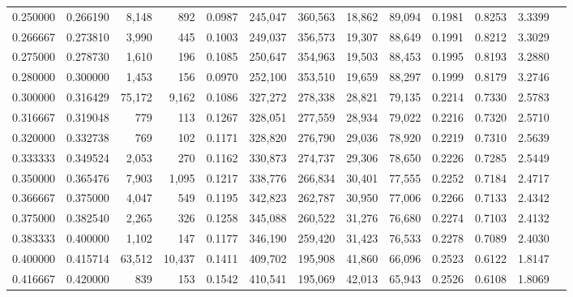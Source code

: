 \begin{tabular}{rrrrrrrrrrrrr}
0.250000 & 0.266190 &  8,148 &    892 &                                     0.0987 & 245,047 & 360,563 &  18,862 &  89,094 & 0.1981 & 0.8253 & 3.3399 \\
0.266667 & 0.273810 &  3,990 &    445 &                                     0.1003 & 249,037 & 356,573 &  19,307 &  88,649 & 0.1991 & 0.8212 & 3.3029 \\
0.275000 & 0.278730 &  1,610 &    196 &                                     0.1085 & 250,647 & 354,963 &  19,503 &  88,453 & 0.1995 & 0.8193 & 3.2880 \\
0.280000 & 0.300000 &  1,453 &    156 &                                     0.0970 & 252,100 & 353,510 &  19,659 &  88,297 & 0.1999 & 0.8179 & 3.2746 \\
0.300000 & 0.316429 & 75,172 &  9,162 &                                     0.1086 & 327,272 & 278,338 &  28,821 &  79,135 & 0.2214 & 0.7330 & 2.5783 \\
0.316667 & 0.319048 &    779 &    113 &                                     0.1267 & 328,051 & 277,559 &  28,934 &  79,022 & 0.2216 & 0.7320 & 2.5710 \\
0.320000 & 0.332738 &    769 &    102 &                                     0.1171 & 328,820 & 276,790 &  29,036 &  78,920 & 0.2219 & 0.7310 & 2.5639 \\
0.333333 & 0.349524 &  2,053 &    270 &                                     0.1162 & 330,873 & 274,737 &  29,306 &  78,650 & 0.2226 & 0.7285 & 2.5449 \\
0.350000 & 0.365476 &  7,903 &  1,095 &                                     0.1217 & 338,776 & 266,834 &  30,401 &  77,555 & 0.2252 & 0.7184 & 2.4717 \\
0.366667 & 0.375000 &  4,047 &    549 &                                     0.1195 & 342,823 & 262,787 &  30,950 &  77,006 & 0.2266 & 0.7133 & 2.4342 \\
0.375000 & 0.382540 &  2,265 &    326 &                                     0.1258 & 345,088 & 260,522 &  31,276 &  76,680 & 0.2274 & 0.7103 & 2.4132 \\
0.383333 & 0.400000 &  1,102 &    147 &                                     0.1177 & 346,190 & 259,420 &  31,423 &  76,533 & 0.2278 & 0.7089 & 2.4030 \\
0.400000 & 0.415714 & 63,512 & 10,437 &                                     0.1411 & 409,702 & 195,908 &  41,860 &  66,096 & 0.2523 & 0.6122 & 1.8147 \\
0.416667 & 0.420000 &    839 &    153 &                                     0.1542 & 410,541 & 195,069 &  42,013 &  65,943 & 0.2526 & 0.6108 & 1.8069 \\

\end{tabular}
